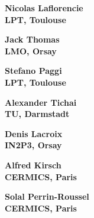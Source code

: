 \documentclass[20pt]{beamer}
\begin{document}
\begin{frame}
	\begin{center}
		\huge \bf Nicolas Laflorencie
		\\
		\vspace{20mm}
		\large  LPT, Toulouse
	\end{center}
\end{frame}

\begin{frame}
	\begin{center}
		\huge \bf Jack Thomas
		\\
		\vspace{20mm}
		\large LMO, Orsay
	\end{center}
\end{frame}

\begin{frame}
	\begin{center}
		\huge \bf Stefano Paggi
		\\
		\vspace{20mm}
		\large LPT, Toulouse
	\end{center}
\end{frame}

\begin{frame}
	\begin{center}
		\huge \bf Alexander Tichai
		\\
		\vspace{20mm}
		\large  TU, Darmstadt
	\end{center}
\end{frame}

\begin{frame}
	\begin{center}
		\huge \bf Denis Lacroix
		\\
		\vspace{20mm}
		\large  IN2P3, Orsay
	\end{center}
\end{frame}

\begin{frame}
	\begin{center}
		\huge \bf Alfred Kirsch
		\\
		\vspace{20mm}
		\large CERMICS, Paris
	\end{center}
\end{frame}

\begin{frame}
	\begin{center}
		\huge \bf Solal Perrin-Roussel 
		\\
		\vspace{20mm}
		\large  CERMICS, Paris
	\end{center}
\end{frame}
\end{document}

